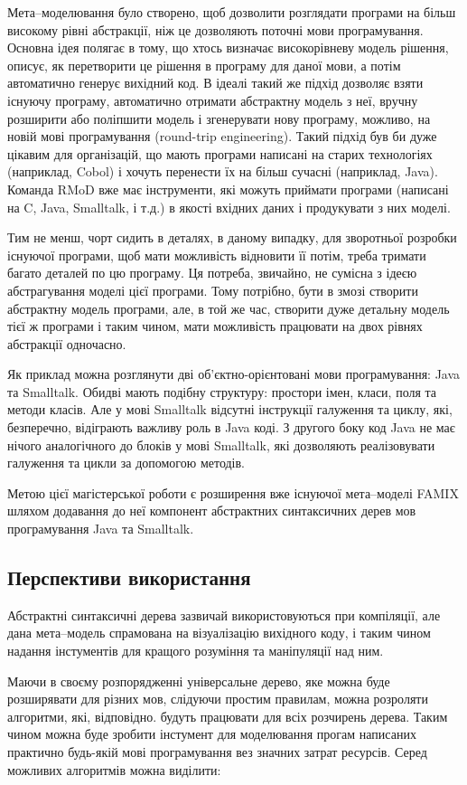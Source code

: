 \documentclass[12pt,a4paper]{article}
\begin{document}
Мета--моделювання було створено, щоб дозволити розглядати програми на більш високому рівні абстракції, ніж це дозволяють поточні мови програмування. Основна ідея полягає в тому, що хтось визначає високорівневу модель рішення, описує, як перетворити це рішення в програму для даної мови, а потім автоматично генерує вихідний код. В ідеалі такий же підхід дозволяє взяти існуючу програму, автоматично отримати абстрактну модель з неї, вручну розширити або поліпшити модель і згенерувати нову програму, можливо, на новій мові програмування (round-trip engineering). Такий підхід був би дуже цікавим для організацій, що мають програми написані на старих технологіях (наприклад, Cobol) і хочуть перенести їх на більш сучасні (наприклад, Java). Команда RMoD вже має інструменти, які можуть приймати програми (написані на C, Java, Smalltalk, і т.д.) в якості вхідних даних і продукувати з них моделі.

Тим не менш, чорт сидить в деталях, в даному випадку, для зворотньої розробки існуючої програми, щоб мати можливість відновити її потім, треба тримати багато деталей по цю програму. Ця потреба, звичайно, не сумісна з ідеєю абстрагування моделі цієї програми. Тому потрібно, бути в змозі створити абстрактну модель програми, але, в той же час, створити дуже детальну модель тієї ж програми і таким чином, мати можливість працювати на двох рівнях абстракції одночасно.

Як приклад можна розглянути дві об'єктно-орієнтовані мови програмування: Java та Smalltalk. Обидві мають подібну структуру: простори імен, класи, поля та методи класів. Але у мові Smalltalk відсутні інструкції галуження та циклу, які, безперечно, відіграють важливу роль в Java коді. З другого боку код Java не має нічого аналогічного до блоків у мові Smalltalk, які дозволяють реалізовувати галуження та цикли за допомогою методів.

Метою цієї магістерської роботи є розширення вже існуючої мета--моделі FAMIX шляхом додавання до неї компонент абстрактних синтаксичних дерев мов програмування Java та Smalltalk.

\subsection{Перспективи використання}
Абстрактні синтаксичні дерева зазвичай використовуються при компіляції, але дана мета--модель спрамована на візуалізацію вихідного коду, і таким чином надання інстументів для кращого розуміння та маніпуляції над ним.

Маючи в своєму розпорядженні універсальне дерево, яке можна буде розширявати для різних мов, слідуючи простим правилам, можна розроляти алгоритми, які, відповідно. будуть працювати для всіх розчирень дерева. Таким чином можна буде зробити інстумент для моделювання прогам написаних практично будь-якій мові програмування вез значних затрат ресурсів. Серед можливих алгоритмів можна виділити:
\end{document}

